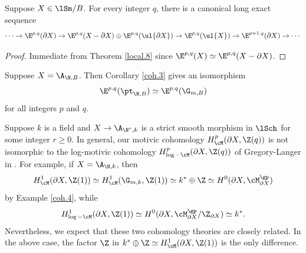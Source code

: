 \documentclass[10pt]{amsart}
\begin{document}
\begin{cor}
\label{coh.3}
Suppose $X\in \lSm/B$.
For every integer $q$, there is a canonical long exact sequence
\[
\cdots
\to
\E^{p,q}(\partial X)
\to
\E^{p,q}(X-\partial X)
\oplus
\E^{p,q}(\ul{\partial X})
\to
\E^{p,q}(\ul{X})
\to
\E^{p+1,q}(\partial X)
\to
\cdots
\]
\end{cor}
\begin{proof}
Immediate from Theorem \ref{local.8} since $\E^{p,q}(X)\simeq \E^{p,q}(X-\partial X)$.
\end{proof}

\begin{exm}
\label{coh.4}
Suppose $X=\A_{\N,B}$.
Then Corollary \ref{coh.3} gives an isomorphism
\[
\E^{p,q}(\pt_{\N,B})
\simeq
\E^{p,q}(\G_{m,B})
\]
for all integers $p$ and $q$.
\end{exm}

\begin{rmk}
Suppose $k$ is a field and $X\to \A_{\N^r,k}$ is a strict smooth morphism in $\lSch$ for some integer $r\geq 0$.
In general, our motivic cohomology $H_{\cM}^p(\partial X,\Z(q))$ is not isomorphic to the log-motivic cohomology $H_{\log-\cM}^p(\partial X,\Z(q))$ of Gregory-Langer in \cite{https://doi.org/10.48550/arxiv.2108.02845}.
For example, if $X=\A_{\N,k}$, then
\[
H_{\cM}^1(\partial X,\Z(1))\simeq H_{\cM}^1(\G_{m,k},\Z(1))\simeq k^*\oplus \Z
\simeq
H^0(\partial X,\cM_{\partial X}^\gp)
\]
by Example \ref{coh.4}, while 
\[
H_{\log-\cM}^1(\partial X,\Z(1))
\simeq
H^0(\partial X,\cM_{\partial X}^\gp/\Z_{\partial X})
\simeq
k^*.
\]
Nevertheless, we expect that these two cohomology theories are closely related.
In the above case, the factor $\Z$ in $k^*\oplus \Z\simeq H_\cM^1(\partial X,\Z(1))$ is the only difference.
\end{rmk}



\end{document}
